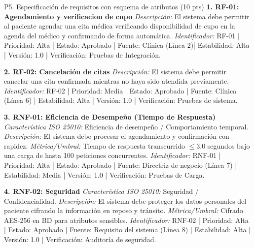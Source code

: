 \documentclass[11pt,a4paper,oneside]{article}
\begin{document}
\begin{tarea}{P5. Especificaci\'on de requisitos con esquema de atributos \hfill (10 pts)}
\small
\textbf{1. RF-01: Agendamiento y verificacion de cupo}  
\textit{Descripci\'on:} El sistema debe permitir al paciente agendar una cita m\'edica verificando disponibilidad de cupo en la agenda del m\'edico y confirmando de forma autom\'atica.  
\textit{Identificador:} RF-01 | Prioridad: Alta | Estado: Aprobado | Fuente: Cl\'inica (L\'inea 2)| Estabilidad: Alta | Versi\'on: 1.0 | Verificaci\'on: Pruebas de Integraci\'on.

\textbf{2. RF-02: Cancelaci\'on de citas }  
\textit{Descripci\'on:} El sistema debe permitir cancelar una cita confirmada mientras no haya sido atendida previamente. 
\textit{Identificador:} RF-02 | Prioridad: Media | Estado: Aprobado | Fuente: Cl\'inica (L\'inea 6) | Estabilidad: Alta | Versi\'on: 1.0 | Verificaci\'on: Pruebas de sistema.

\textbf{3. RNF-01: Eficiencia de Desempe\~no (Tiempo de Respuesta)}  
\textit{Caracter\'istica ISO 25010:} Eficiencia de desempe\~no / Comportamiento temporal.  
\textit{Descripci\'on:} El sistema debe procesar el agendamiento y confirmaci\'on con rapidez.  
\textit{M\'etrica/Umbral:} Tiempo de respuesta transcurrido $\le 3.0$ segundos bajo una carga de hasta 100 peticiones concurrentes.  
\textit{Identificador:} RNF-01 | Prioridad: Alta | Estado: Aprobado | Fuente: Directriz de negocio (L\'inea 7) | Estabilidad: Media | Versi\'on: 1.0 | Verificaci\'on: Pruebas de Carga.

\textbf{4. RNF-02: Seguridad}  
\textit{Caracter\'istica ISO 25010:} Seguridad / Confidencialidad.  
\textit{Descripci\'on:} El sistema debe proteger los datos personales del paciente cifrando la informaci\'on en reposo y tr\'ansito.  
\textit{M\'etrica/Umbral:} Cifrado AES-256 en BD para atributos sensibles. 
\textit{Identificador:} RNF-02 | Prioridad: Alta | Estado: Aprobado | Fuente: Requisito del sistema (L\'inea 8) | Estabilidad: Alta | Versi\'on: 1.0 | Verificaci\'on: Auditor\'ia de seguridad.
\end{tarea}
\end{document}
